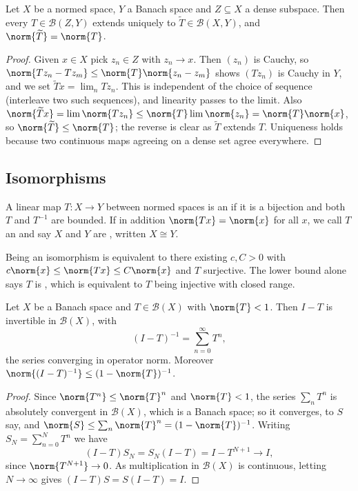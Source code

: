 \documentclass[a4paper]{scrartcl}
\newcommand{\Bop}{\mathcal{B}}
\newcommand{\wt}{\widetilde}
\begin{document}
\begin{proposition}
	Let $X$ be a normed space, $Y$ a Banach space and $Z \subseteq X$ a dense subspace. Then every $T \in \Bop(Z, Y)$ extends uniquely to $\wt{T} \in \Bop(X,Y)$, and $\norm{\wt T} = \norm{T}$.
\end{proposition}

\begin{proof}
	Given $x \in X$ pick $z_n \in Z$ with $z_n \to x$. Then $(z_n)$ is Cauchy, so $\norm{Tz_n - Tz_m} \leq \norm{T} \norm{z_n - z_m}$ shows $(Tz_n)$ is Cauchy in $Y$, and we set $\wt{T}x = \lim_n Tz_n$. This is independent of the choice of sequence (interleave two such sequences), and linearity passes to the limit. Also $\norm{\wt T x} = \lim \norm{Tz_n} \leq \norm{T}\lim\norm{z_n} = \norm{T}\norm{x}$, so $\norm{\wt T} \leq \norm{T}$; the reverse is clear as $\wt T$ extends $T$. Uniqueness holds because two continuous maps agreeing on a dense set agree everywhere.
\end{proof}

\subsection{Isomorphisms}

\begin{definition}[Isomorphism]
	A linear map $T : X \to Y$ between normed spaces is an  if it is a bijection and both $T$ and $T^{-1}$ are bounded. If in addition $\norm{Tx} = \norm{x}$ for all $x$, we call $T$ an  and say $X$ and $Y$ are , written $X \cong Y$.
\end{definition}

Being an isomorphism is equivalent to there existing $c, C > 0$ with $c\norm{x} \leq \norm{Tx} \leq C\norm{x}$ and $T$ surjective. The lower bound alone says $T$ is , which is equivalent to $T$ being injective with closed range.

\begin{proposition}
	Let $X$ be a Banach space and $T \in \Bop(X)$ with $\norm{T} < 1$. Then $I - T$ is invertible in $\Bop(X)$, with
	$$(I - T)^{-1} = \sum_{n=0}^\infty T^n,$$
	the series converging in operator norm. Moreover $\norm{(I-T)^{-1}} \leq (1 - \norm{T})^{-1}$.
\end{proposition}

\begin{proof}
	Since $\norm{T^n} \leq \norm{T}^n$ and $\norm{T} < 1$, the series $\sum_n T^n$ is absolutely convergent in $\Bop(X)$, which is a Banach space; so it converges, to $S$ say, and $\norm{S} \leq \sum_n \norm{T}^n = (1-\norm{T})^{-1}$. Writing $S_N = \sum_{n=0}^N T^n$ we have
	$$(I - T)S_N = S_N(I-T) = I - T^{N+1} \longrightarrow I,$$
	since $\norm{T^{N+1}} \to 0$. As multiplication in $\Bop(X)$ is continuous, letting $N \to \infty$ gives $(I-T)S = S(I-T) = I$.
\end{proof}
\end{document}
